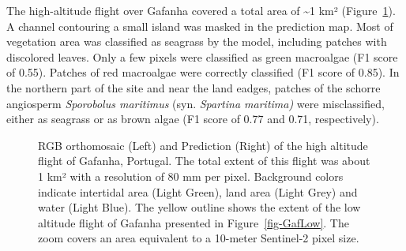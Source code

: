 \documentclass[
  number]{elsarticle}
\begin{document}
The high-altitude flight over Gafanha covered a total area of
\textasciitilde1 km² (Figure~\ref{fig-GafHigh}). A channel contouring a
small island was masked in the prediction map. Most of vegetation area
was classified as seagrass by the model, including patches with
discolored leaves. Only a few pixels were classified as green macroalgae
(F1 score of 0.55). Patches of red macroalgae were correctly classified
(F1 score of 0.85). In the northern part of the site and near the land
eadges, patches of the schorre angiosperm \emph{Sporobolus maritimus}
(syn. \emph{Spartina maritima)} were misclassified, either as seagrass
or as brown algae (F1 score of 0.77 and 0.71, respectively).

\label{cell-fig-GafHigh}
\begin{figure}[H]


\caption{\label{fig-GafHigh}RGB orthomosaic (Left) and Prediction
(Right) of the high altitude flight of Gafanha, Portugal. The total
extent of this flight was about 1 km² with a resolution of 80 mm per
pixel. Background colors indicate intertidal area (Light Green), land
area (Light Grey) and water (Light Blue). The yellow outline shows the
extent of the low altitude flight of Gafanha presented in
Figure~\ref{fig-GafLow}. The zoom covers an area equivalent to a
10-meter Sentinel-2 pixel size.}

\end{figure}%
\end{document}
